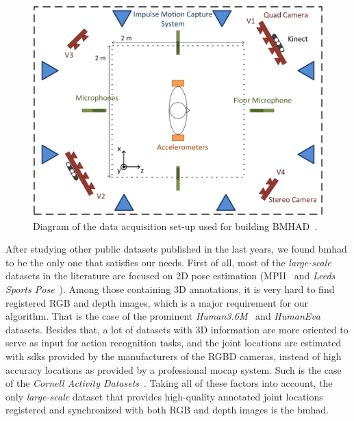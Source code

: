 \begin{figure}[h]
    \centering
    \includegraphics[width=\textwidth]{figures/bmhad_setup.png}
    \caption{Diagram of the data acquisition set-up used for building BMHAD~\cite{ofli2013berkeley}.}
    \label{fig:bmhad_setup}
\end{figure}

After studying other public datasets published in the last years, we found \gls{bmhad} to be the only one that satisfies our needs. First of all, most of the \emph{large-scale} datasets in the literature are focused on 2D pose estimation (\eg MPII~\cite{andriluka20142d} and \emph{Leeds Sports Pose}~\cite{Johnson10}). Among those containing 3D annotations, it is very hard to find registered RGB and depth images, which is a major requirement for our algorithm. That is the case of the prominent \emph{Human3.6M}~\cite{ionescu2013human3} and \emph{HumanEva}~\cite{sigal2010humaneva} datasets. Besides that, a lot of datasets with 3D information are more oriented to serve as input for action recognition tasks, and the joint locations are estimated with \glspl{sdk} provided by the manufacturers of the RGBD cameras, instead of high accuracy locations as provided by a professional \gls{mocap} system. Such is the case of the \emph{Cornell Activity Datasets}~\cite{sung2011human}. Taking all of these factors into account, the only \emph{large-scale} dataset that provides high-quality annotated joint locations registered and synchronized with both RGB and depth images is the \gls{bmhad}.

